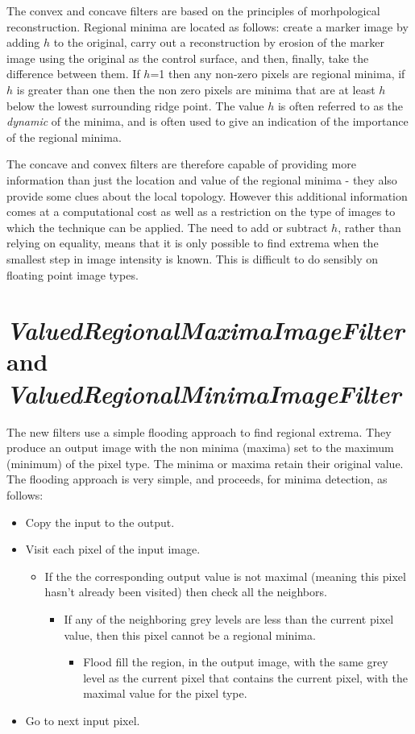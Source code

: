 \documentclass{InsightArticle}
\begin{document}
The convex and concave filters are based on the principles of
morhpological reconstruction. Regional minima are located as follows:
create a marker image by adding $h$ to the original, carry out a
reconstruction by erosion of the marker image using the original as
the control surface, and then, finally, take the difference between
them. If $h$=1 then any non-zero pixels are regional minima, if $h$ is
greater than one then the non zero pixels are minima that are at least
$h$ below the lowest surrounding ridge point. The value $h$ is often
referred to as the {\em dynamic} of the minima, and is often used to
give an indication of the importance of the regional minima.

The concave and convex filters are therefore capable of providing more
information than just the location and value of the regional minima -
they also provide some clues about the local topology. However this
additional information comes at a computational cost as well as a
restriction on the type of images to which the technique can be
applied. The need to add or subtract $h$, rather than relying on
equality, means that it is only possible to find extrema when the
smallest step in image intensity is known. This is difficult to do
sensibly on floating point image types.

\section{{\em ValuedRegionalMaximaImageFilter} and {\em ValuedRegionalMinimaImageFilter}}
The new filters use a simple flooding approach to find regional
extrema. They produce an output image with the non minima (maxima) set
to the maximum (minimum) of the pixel type. The minima or maxima
retain their original value. 
The flooding approach is very simple, and proceeds, for minima detection, as follows:
\begin{itemize}
\item Copy the input to the output.
\item Visit each pixel of the input image. 
   \begin{itemize}	
   \item If the the corresponding output 
	 value is not maximal (meaning this pixel hasn't already been
      visited) then check all the neighbors. 
   \begin{itemize}
      \item If any of the neighboring grey levels are less than the current pixel 
        value, then this pixel cannot be a regional minima.
      \begin{itemize}
         \item Flood fill the region, in the output image, with the same grey level 
          as the current pixel that contains the current pixel, with the
          maximal value for the pixel type.
      \end{itemize}
    \end{itemize}	
    \end{itemize}
\item Go to next input pixel.
\end{itemize}
\end{document}
